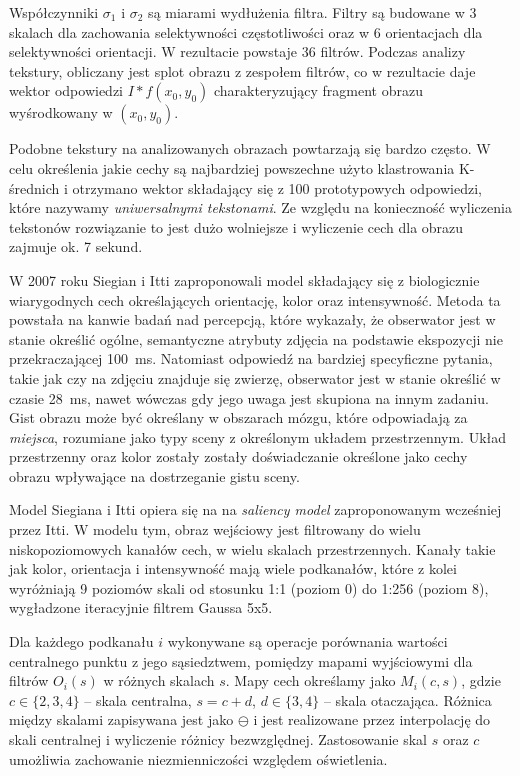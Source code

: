 Współczynniki $\sigma_1$ i $\sigma_2$ są miarami wydłużenia filtra. Filtry są budowane w 3 skalach dla zachowania selektywności częstotliwości oraz w 6 orientacjach dla selektywności orientacji. W rezultacie powstaje 36 filtrów. Podczas analizy tekstury, obliczany jest splot obrazu z zespołem filtrów, co w rezultacie daje wektor odpowiedzi $I \ast f(x_0, y_0)$ charakteryzujący fragment obrazu wyśrodkowany w $(x_0, y_0)$. 

Podobne tekstury na analizowanych obrazach powtarzają się bardzo często. W celu określenia jakie cechy są najbardziej powszechne użyto klastrowania K-średnich i otrzymano wektor składający się z 100 prototypowych odpowiedzi, które nazywamy \emph{uniwersalnymi tekstonami}. Ze względu na konieczność wyliczenia tekstonów rozwiązanie to jest dużo wolniejsze i wyliczenie cech dla obrazu zajmuje ok. 7 sekund.\cite{VISWANATHAN08}

W 2007 roku Siegian i Itti zaproponowali model składający się z biologicznie wiarygodnych cech określających orientację, kolor oraz intensywność.\cite{SIAGIAN07} Metoda ta powstała na kanwie badań nad percepcją, które wykazały, że obserwator jest w stanie określić ogólne, semantyczne atrybuty zdjęcia na podstawie ekspozycji nie przekraczającej 100~ms. Natomiast odpowiedź na bardziej specyficzne pytania, takie jak czy na zdjęciu znajduje się zwierzę, obserwator jest w stanie określić w czasie 28~ms\cite{THORPE95}, nawet wówczas gdy jego uwaga jest skupiona na innym zadaniu. Gist obrazu może być określany w obszarach mózgu, które odpowiadają za \emph{miejsca}, rozumiane jako typy sceny z określonym układem przestrzennym.\cite{EPSTEIN00} Układ przestrzenny oraz kolor zostały zostały doświadczanie określone jako cechy obrazu wpływające na dostrzeganie gistu sceny.\cite{OLIVA-SCHYNS00}

Model Siegiana i Itti opiera się na na \emph{saliency model} zaproponowanym wcześniej przez Itti. W modelu tym, obraz wejściowy jest filtrowany do wielu niskopoziomowych kanałów cech, w wielu skalach przestrzennych. Kanały takie jak kolor, orientacja i intensywność mają wiele podkanałów, które z kolei wyróżniają 9 poziomów skali od stosunku 1:1 (poziom 0) do 1:256 (poziom 8), wygładzone iteracyjnie filtrem Gaussa 5x5.

Dla każdego podkanału $i$ wykonywane są operacje porównania wartości centralnego punktu z jego sąsiedztwem, pomiędzy mapami wyjściowymi dla filtrów $O_i(s)$ w różnych skalach $s$. Mapy cech określamy jako $M_i(c, s)$, gdzie $c \in \{2, 3, 4\}$ -- skala centralna, $s = c + d$, $d \in \{3, 4\}$ -- skala otaczająca. Różnica między skalami zapisywana jest jako $\ominus$ i jest realizowane przez interpolację do skali centralnej i wyliczenie różnicy bezwzględnej. Zastosowanie skal $s$ oraz $c$ umożliwia zachowanie niezmienniczości względem oświetlenia.

